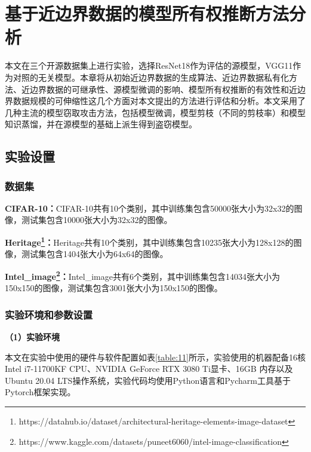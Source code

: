 
\chapter{基于近边界数据的模型所有权推断方法分析}\label{5}

本文在三个开源数据集上进行实验，选择ResNet18作为评估的源模型，VGG11作为对照的无关模型。本章将从初始近边界数据的生成算法、近边界数据私有化方法、近边界数据的可继承性、源模型微调的影响、模型所有权推断的有效性和近边界数据规模的可伸缩性这几个方面对本文提出的方法进行评估和分析。本文采用了几种主流的模型窃取攻击方法，包括模型微调，模型剪枝（不同的剪枝率）和模型知识蒸馏，并在源模型的基础上派生得到盗窃模型。

\section{实验设置}\label{5.1}

\subsection{数据集}

\noindent\textbf{CIFAR-10\cite{krizhevsky2009learning}：}CIFAR-10共有10个类别，其中训练集包含50000张大小为32x32的图像，测试集包含10000张大小为32x32的图像。

\noindent\textbf{Heritage\footnote{https://datahub.io/dataset/architectural-heritage-elements-image-dataset}：}Heritage共有10个类别，其中训练集包含10235张大小为128x128的图像，测试集包含1404张大小为64x64的图像。

\noindent\textbf{Intel\_image\footnote{https://www.kaggle.com/datasets/puneet6060/intel-image-classification}：}Intel\_image共有6个类别，其中训练集包含14034张大小为150x150的图像，测试集包含3001张大小为150x150的图像。

\subsection{实验环境和参数设置}

\textbf{（1）实验环境}

本文在实验中使用的硬件与软件配置如表\ref{table:11}所示，实验使用的机器配备16核Intel i7-11700KF CPU、NVIDIA GeForce RTX 3080 Ti显卡、16GB 内存以及Ubuntu 20.04 LTS操作系统，实验代码均使用Python语言和Pycharm工具基于Pytorch框架实现。

